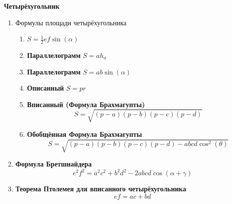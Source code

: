 \documentclass{article}
\begin{document}
\begin{center}
\textbf{Четырёхугольник}
\end{center}

\begin{enumerate}[label*=\protect\fbox{\arabic{enumi}}]

\item Формулы площади четырёхугольника
\begin{enumerate} 
	\item $S = \frac{1}{2}ef\sin(\alpha)$
	\item \textbf{Параллелограмм} $S = ah_a$
	\item \textbf{Параллелограмм} $S = ab\sin(\alpha)$
	\item \textbf{Описанный} $S = pr$
	\item \textbf{Вписанный (Формула Брахмагупты)} $$S = \sqrt{(p-a)(p-b)(p-c)(p-d)}$$
	\item \textbf{Обобщённая Формула Брахмагупты} $$S = \sqrt{(p-a)(p-b)(p-c)(p-d) - abcd\cos^2(\theta)}$$
\end{enumerate}

\item \textbf{Формула Бретшнайдера}  $$e^2f^2 = a^2c^2 + b^2d^2 - 2abcd\cos(\alpha + \gamma)$$

\item \textbf{Теорема Птолемея для вписанного четырёхугольника}   $$ef = ac + bd$$



\end{enumerate}
\end{document}
